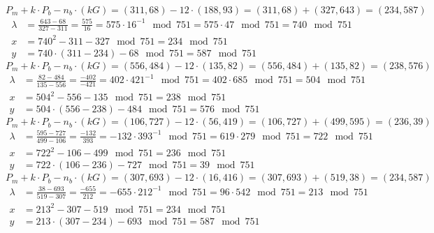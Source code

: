 $P_m + k \cdot P_b - n_b \cdot (kG) = (311, 68) - 12 \cdot (188, 93) = (311, 68) + (327, 643)=(234, 587)$
\begin{equation*}
	\begin{aligned}
		\lambda &= \frac{643-68}{327-311} = \frac{575}{16} = 575 \cdot 16^{-1}\mod{751} = 575 \cdot 47\mod{751} = 740\mod{751} \\
		x &= 740^2 - 311 - 327 \mod{751} = 234\mod{751} \\
		y &= 740 \cdot (311 - 234) - 68\mod{751} = 587\mod{751}
	\end{aligned}
\end{equation*}
$P_m + k \cdot P_b - n_b \cdot (kG) = (556, 484) - 12 \cdot (135, 82) = (556, 484) + (135, 82)=(238, 576)$
\begin{equation*}
	\begin{aligned}
		\lambda &= \frac{82-484}{135-556} = \frac{-402}{-421} = 402 \cdot 421^{-1}\mod{751} = 402 \cdot 685\mod{751} = 504\mod{751} \\
		x &= 504^2 - 556 - 135 \mod{751} = 238\mod{751} \\
		y &= 504 \cdot (556 - 238) - 484\mod{751} = 576\mod{751}
	\end{aligned}
\end{equation*}
$P_m + k \cdot P_b - n_b \cdot (kG) = (106, 727) - 12 \cdot (56, 419) = (106, 727) + (499, 595)=(236, 39)$
\begin{equation*}
	\begin{aligned}
		\lambda &= \frac{595-727}{499-106} = \frac{-132}{393} = -132 \cdot 393^{-1}\mod{751} = 619 \cdot 279\mod{751} = 722\mod{751} \\
		x &= 722^2 - 106 - 499 \mod{751} = 236\mod{751} \\
		y &= 722 \cdot (106 - 236) - 727\mod{751} = 39\mod{751}
	\end{aligned}
\end{equation*}
$P_m + k \cdot P_b - n_b \cdot (kG) = (307, 693) - 12 \cdot (16, 416) = (307, 693) + (519, 38)=(234, 587)$
\begin{equation*}
	\begin{aligned}
		\lambda &= \frac{38-693}{519-307} = \frac{-655}{212} = -655 \cdot 212^{-1}\mod{751} = 96 \cdot 542\mod{751} = 213\mod{751} \\
		x &= 213^2 - 307 - 519 \mod{751} = 234\mod{751} \\
		y &= 213 \cdot (307 - 234) - 693\mod{751} = 587\mod{751}
	\end{aligned}
\end{equation*}

